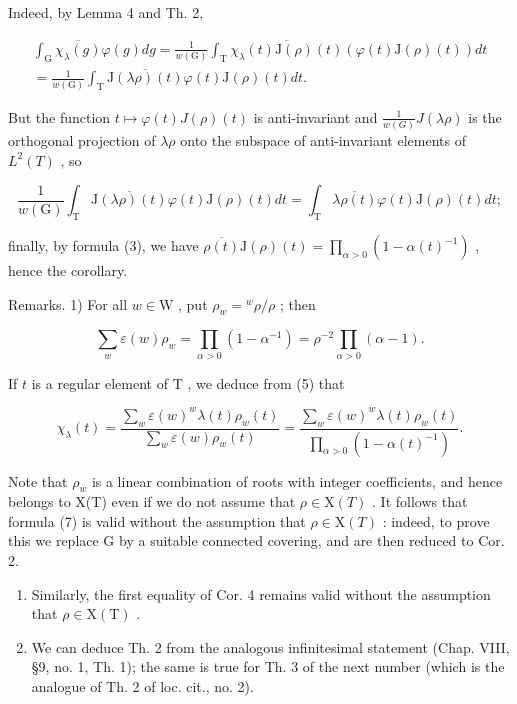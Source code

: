 Indeed, by Lemma 4 and Th. 2,

\[
\begin{array}{c} \int_ {\mathrm{G}} \overline {{\chi_ {\lambda} (g)}} \varphi (g) d g = \frac {1}{w (\mathrm{G})} \int_ {\mathrm{T}} \overline {{\chi_ {\lambda} (t) \mathrm{J} (\rho) (t)}} (\varphi (t) \mathrm{J} (\rho) (t)) d t \\ = \frac {1}{w (\mathrm{G})} \int_ {\mathrm{T}} \overline {{\mathrm{J} (\lambda \rho) (t)}} \varphi (t) \mathrm{J} (\rho) (t) d t. \end{array}
\]

But the function \(t \mapsto \varphi(t)J(\rho)(t)\) is anti-invariant and \(\frac{1}{w(G)}J(\lambda\rho)\) is the orthogonal projection of \(\lambda\rho\) onto the subspace of anti-invariant elements of \(L^{2}(T)\) , so

\[
\frac {1}{w (\mathrm{G})} \int_ {\mathrm{T}} \overline {{\mathrm{J} (\lambda \rho) (t)}} \varphi (t) \mathrm{J} (\rho) (t) d t = \int_ {\mathrm{T}} \overline {{\lambda \rho (t)}} \varphi (t) \mathrm{J} (\rho) (t) d t;
\]

finally, by formula (3), we have \(\overline{\rho(t)}\mathrm{J}(\rho)(t) = \prod_{\alpha >0}(1 - \alpha (t)^{-1})\) , hence the corollary.

Remarks. 1) For all \(w \in \mathrm{W}\) , put \(\rho_w = {}^w\rho /\rho\) ; then

\[
\sum_ {w} \varepsilon (w) \rho_ {w} = \prod_ {\alpha > 0} (1 - \alpha^ {- 1}) = \rho^ {- 2} \prod_ {\alpha > 0} (\alpha - 1).\tag{6}
\]

If \(t\) is a regular element of \(\mathrm{T}\) , we deduce from (5) that

\[
\chi_ {\lambda} (t) = \frac {\sum_ {w} \varepsilon (w) ^ {w} \lambda (t) \rho_ {w} (t)}{\sum_ {w} \varepsilon (w) \rho_ {w} (t)} = \frac {\sum_ {w} \varepsilon (w) ^ {w} \lambda (t) \rho_ {w} (t)}{\prod_ {\alpha > 0} (1 - \alpha (t) ^ {- 1})}.\tag{7}
\]

Note that \(\rho_{w}\) is a linear combination of roots with integer coefficients, and hence belongs to X(T) even if we do not assume that \(\rho \in \mathrm{X}(T)\) . It follows that formula (7) is valid without the assumption that \(\rho \in \mathrm{X}(T)\) : indeed, to prove this we replace G by a suitable connected covering, and are then reduced to Cor. 2.

\begin{enumerate}
\def\labelenumi{\arabic{enumi})}
\setcounter{enumi}{1}
\item
  Similarly, the first equality of Cor. 4 remains valid without the assumption that \(\rho \in \mathrm{X}(\mathrm{T})\) .
\item
  We can deduce Th. 2 from the analogous infinitesimal statement (Chap. VIII, §9, no. 1, Th. 1); the same is true for Th. 3 of the next number (which is the analogue of Th. 2 of loc. cit., no. 2).
\end{enumerate}


